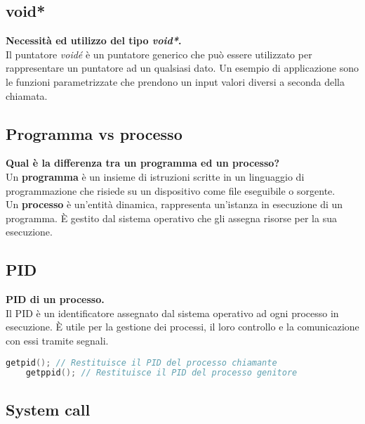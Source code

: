 \subsection{void*}
\textbf{Necessità ed utilizzo del tipo \textit{void*}.}\\
Il puntatore \textit{voidé} è un puntatore generico che  può essere utilizzato per rappresentare un puntatore ad un qualsiasi dato. Un esempio di applicazione sono le funzioni parametrizzate che prendono un input valori diversi a seconda della chiamata.

\subsection{Programma vs processo}
\textbf{Qual è la differenza tra un programma ed un processo?}\\
Un \textbf{programma} è un insieme di istruzioni scritte in un linguaggio di programmazione che risiede su un dispositivo come file eseguibile o sorgente.\\
Un \textbf{processo} è un'entità dinamica, rappresenta un'istanza in esecuzione di un programma. È gestito dal sistema operativo che gli assegna risorse per la sua esecuzione.

\subsection{PID}
\textbf{PID di un processo.}\\
Il PID è un identificatore assegnato dal sistema operativo ad ogni processo in esecuzione. È utile per la gestione dei processi, il loro controllo e la comunicazione con essi tramite segnali.
\begin{lstlisting}[language=C]
	getpid(); // Restituisce il PID del processo chiamante
	getppid(); // Restituisce il PID del processo genitore
\end{lstlisting}

\subsection{System call}

